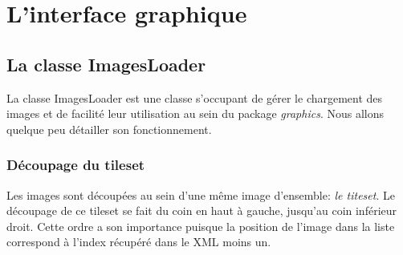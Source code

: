 \documentclass[a4paper,12pt]{article} %
\begin{document}
\section{L'interface graphique}
\subsection{La classe ImagesLoader}
La classe ImagesLoader est une classe s’occupant de gérer le chargement des images et de facilité leur utilisation au sein du package \textit{graphics}. Nous allons quelque peu détailler son fonctionnement.
\subsubsection{Découpage du tileset}
Les images sont découpées au sein d'une même image d'ensemble: \textit{le titeset}. Le découpage de ce tileset se fait du coin en haut à gauche, jusqu'au coin inférieur droit. Cette ordre a son importance puisque la position de l'image dans la liste correspond à l'index récupéré dans le XML moins un.
\end{document}
